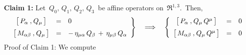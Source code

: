 \vskip 0.3cm
\noindent
\textbf{Claim 1:}\quad
Let \,$Q_{0},\, Q_{1},\, Q_{2},\, Q_{3}$\, be affine operators on \,$\Re^{1,3}$.\,
Then,
\begin{equation*}
\left.\begin{array}{ccl}
	\left[\,P_{\alpha}\,\overset{{\color{white}1}}{,}\,Q_{\mu}\,\right]
	& = &
		0
	\\
	\left[\,M_{\alpha\beta}\,\overset{{\color{white}1}}{,}\,Q_{\mu}\,\right]
	& \overset{{\color{white}\textnormal{\large$1$}}}{=} &
		-\,\eta_{\mu\alpha}\,Q_{\beta} \,+\, \eta_{\mu\beta}\,Q_{\alpha} 
	\end{array}\right\}
\quad\Longrightarrow\quad
	\left\{\begin{array}{ccc}
		\left[\,P_{\alpha}\,\overset{{\color{white}1}}{,}\,Q_{\mu}\,Q^{\mu}\,\right]
		& = &
			0
		\\
		\left[\,M_{\alpha\beta}\,\overset{{\color{white}1}}{,}\,Q_{\mu}\,Q^{\mu}\,\right]
		& \overset{{\color{white}\textnormal{\large$1$}}}{=} &
			0
		\end{array}\right.
\end{equation*}
\vskip0.1cm
\noindent
Proof of Claim 1:\;\; We compute
